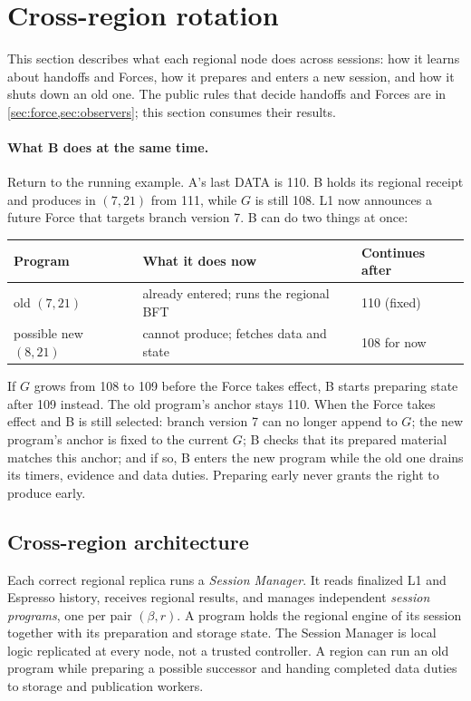 \documentclass[11pt,a4paper]{article}
\newcommand{\defterm}[1]{\textcolor{rrBlue}{\textit{#1}}}
\newcounter{protocol}
\begin{document}
\section{Cross-region rotation}
\label{sec:xprotocols}
This section describes what each regional node does across sessions:
how it learns about handoffs and Forces, how it prepares and enters a new
session, and how it shuts down an old one. The public rules that decide
handoffs and Forces are in \cref{sec:force,sec:observers}; this section
consumes their results.

\paragraph{What B does at the same time.}
Return to the running example. A's last DATA is 110. B holds its regional
receipt and produces in $(7,21)$ from 111, while $G$ is still 108. L1 now
announces a future Force that targets branch version 7. B can do two
things at once:
\begin{center}\small
\begin{tabular}{@{}lll@{}}\toprule
Program & What it does now & Continues after\\\midrule
old $(7,21)$ & already entered; runs the regional BFT & 110 (fixed)\\
possible new $(8,21)$ & cannot produce; fetches data and state & 108 for now\\\bottomrule
\end{tabular}
\end{center}
If $G$ grows from 108 to 109 before the Force takes effect, B starts
preparing state after 109 instead. The old program's anchor stays 110.
When the Force takes effect and B is still selected: branch version 7
can no longer append to $G$; the new program's anchor is fixed to the
current $G$; B checks that its prepared material matches this anchor;
and if so, B enters the new program while the old one drains its timers,
evidence and data duties. Preparing early never grants the right to
produce early.

\subsection{Cross-region architecture}
\label{sec:runtime-modules}
Each correct regional replica runs a \defterm{Session Manager}. It reads
finalized L1 and Espresso history, receives regional results, and manages
independent \defterm{session programs}, one per pair $(\beta,r)$. A
program holds the regional engine of its session together with its
preparation and storage state. The Session Manager is local logic
replicated at every node, not a trusted controller. A region can run an
old program while preparing a possible successor and handing completed
data duties to storage and publication workers.
\end{document}

